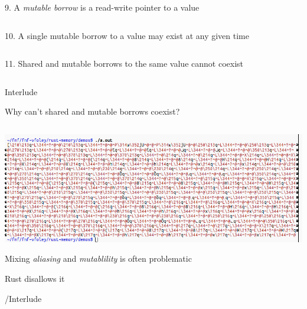 \documentclass[9pt]{beamer}
\renewcommand\big[1]{
  \begin{center}
    \Large{#1}
  \end{center}
}
\begin{document}
\begin{frame}
  \big{9. A \emph{mutable borrow} is a read-write pointer to a value}
\end{frame}

\begin{frame}[fragile]
  \inputminted{rust}{demos/07_mut_borrow.rs}
\end{frame}

\begin{frame}
  \big{10. A single mutable borrow to a value may exist at any given time}
\end{frame}

\begin{frame}[fragile]
  \inputminted{rust}{demos/08_single_mut_borrow.rs}
\end{frame}

\begin{frame}
  \big{11. Shared and mutable borrows to the same value cannot coexist}
\end{frame}

\begin{frame}[fragile]
  \inputminted{rust}{demos/09_mutex_borrows.rs}
\end{frame}

\begin{frame}[plain]
  \centering\Huge{Interlude}

  \big{Why can't shared and mutable borrows coexist?}
\end{frame}

\begin{frame}[fragile]
  \inputminted{c++}{demos/interlude.cpp}
\end{frame}

\begin{frame}
  \centering\includegraphics[scale=0.32]{demos/boom.png}
\end{frame}

\begin{frame}
  \big{Mixing \emph{aliasing} and \emph{mutablility} is often problematic}

  \big{Rust disallows it}
\end{frame}

\begin{frame}[plain]
  \centering\Huge{/Interlude}
\end{frame}
\end{document}
